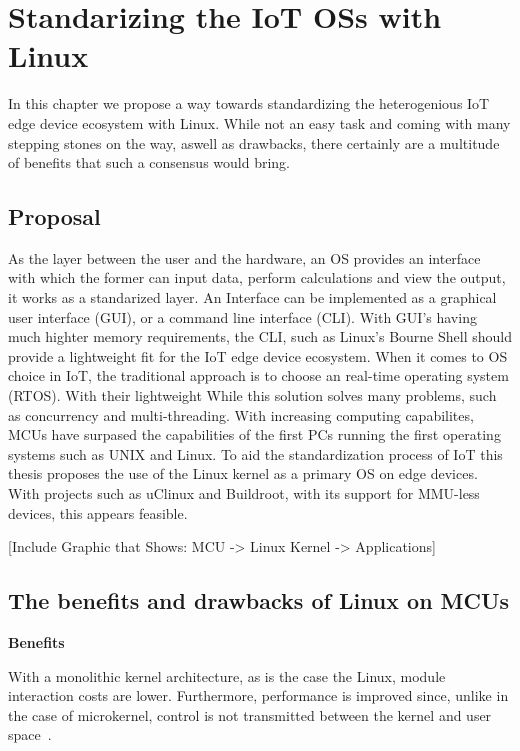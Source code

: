 \chapter{Standarizing the IoT OSs with Linux}

In this chapter we propose a way towards standardizing the heterogenious IoT edge device ecosystem with Linux. While not an easy task and coming with many stepping stones on the way, aswell as drawbacks, there certainly are a multitude of benefits that such a consensus would bring.

\section{Proposal}
As the layer between the user and the hardware, an OS provides an interface with which the former can input data, perform calculations and view the output, it works as a standarized layer. An Interface can be implemented as a graphical user interface (GUI), or a command line interface (CLI). With GUI's having much highter memory requirements, the CLI, such as Linux's Bourne Shell  should provide a lightweight fit for the IoT edge device ecosystem. When it comes to OS choice in IoT, the traditional approach is to choose an real-time operating system (RTOS). With their lightweight While this solution solves many problems, such as concurrency and multi-threading. With increasing computing capabilites, MCUs have surpased the capabilities of the first PCs running the first operating systems such as UNIX and Linux. To aid the standardization process of IoT this thesis proposes the use of the Linux kernel as a primary OS on edge devices. With projects such as uClinux and Buildroot, with its support for MMU-less devices, this appears feasible.

[Include Graphic that Shows: MCU -> Linux Kernel -> Applications]

\section{The benefits and drawbacks of Linux on MCUs}

\textbf{Benefits}

With a monolithic kernel architecture, as is the case the Linux, module interaction costs are lower. Furthermore, performance is improved since, unlike in the case of microkernel, control is not transmitted between the kernel and user space~\cite{gaur2015operating}. 

